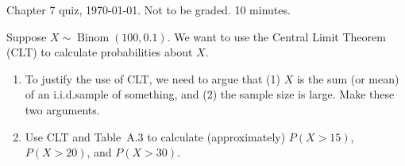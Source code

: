 \documentclass[12pt]{article}
\begin{document}
\thispagestyle{empty}

Chapter 7 quiz, \today. Not to be graded. 10 minutes.
\bigskip

Suppose $X \sim \operatorname{Binom}(100, 0.1)$.
We want to use the Central Limit Theorem (CLT)
to calculate probabilities about $X$.
\begin{enumerate}
\item To justify the use of CLT, we need to argue that
    (1) $X$ is the sum (or mean) of an i.i.d.\@ sample of something, and
    (2) the sample size is large.
    Make these two arguments.
\item Use CLT and Table~A.3 to calculate (approximately)
    $P(X > 15)$, $P(X > 20)$, and $P(X > 30)$.
\end{enumerate}
\end{document}
